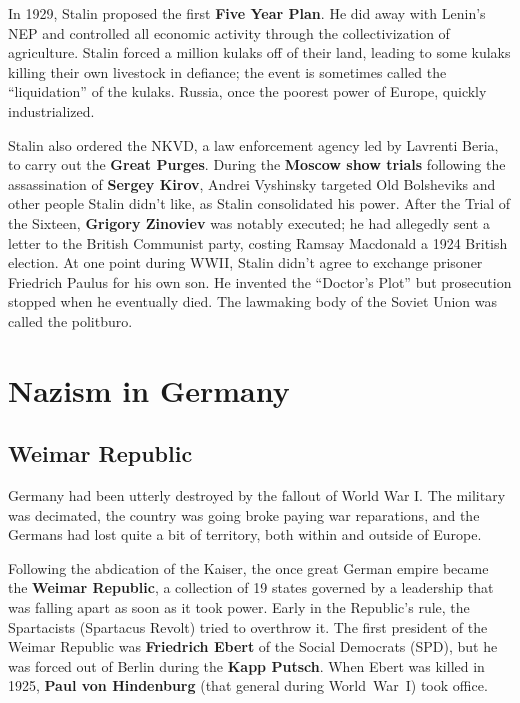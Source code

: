 In 1929, Stalin proposed the first \textbf{Five Year Plan}.
He did away with Lenin's NEP and controlled all economic activity through the collectivization of agriculture.
Stalin forced a million kulaks off of their land,
leading to some kulaks killing their own livestock in defiance;
the event is sometimes called the ``liquidation'' of the kulaks.
Russia, once the poorest power of Europe, quickly industrialized.

Stalin also ordered the NKVD, a law enforcement agency led by Lavrenti Beria,
to carry out the \textbf{Great Purges}.
During the \textbf{Moscow show trials} following the assassination of \textbf{Sergey Kirov},
Andrei Vyshinsky targeted Old Bolsheviks and other people Stalin didn't like,
as Stalin consolidated his power.
After the Trial of the Sixteen, \textbf{Grigory Zinoviev} was notably executed;
he had allegedly sent a letter to the British Communist party,
costing Ramsay Macdonald a 1924 British election.
At one point during WWII, Stalin didn't agree to exchange prisoner Friedrich Paulus for his own son.
He invented the ``Doctor's Plot'' but prosecution stopped when he eventually died.
The lawmaking body of the Soviet Union was called the politburo.

\section{Nazism in Germany}

\subsection*{Weimar Republic}

Germany had been utterly destroyed by the fallout of World War I\@.
The military was decimated, the country was going broke paying war reparations,
and the Germans had lost quite a bit of territory, both within and outside of Europe.

Following the abdication of the Kaiser,
the once great German empire became the \textbf{Weimar Republic},
a collection of 19 states governed by a leadership that was falling apart as soon as it took power.
Early in the Republic's rule, the Spartacists (Spartacus Revolt) tried to overthrow it.
The first president of the Weimar Republic was
\textbf{Friedrich Ebert} of the Social Democrats (SPD),
but he was forced out of Berlin during the \textbf{Kapp Putsch}.
When Ebert was killed in 1925,
\textbf{Paul von Hindenburg} (that general during World~War~I) took office.

